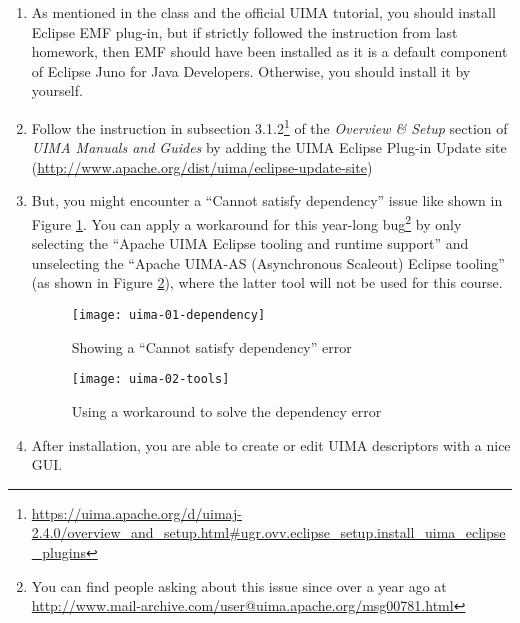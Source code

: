 \begin{enumerate}

\item As mentioned in the class and the official UIMA tutorial, you should
install Eclipse EMF plug-in, but if strictly followed the instruction from last
homework, then EMF should have been installed as it is a default component of
Eclipse Juno for Java Developers. Otherwise, you should install it by yourself.

\item Follow the instruction in subsection
3.1.2\footnote{\url{https://uima.apache.org/d/uimaj-2.4.0/overview_and_setup.html\#ugr.ovv.eclipse_setup.install_uima_eclipse_plugins}}
of the \emph{Overview \& Setup} section of \emph{UIMA Manuals and Guides} by
adding the UIMA Eclipse Plug-in Update site
(\url{http://www.apache.org/dist/uima/eclipse-update-site})

\item But, you might encounter a ``Cannot satisfy dependency'' issue like shown
in Figure \ref{fig:uima-01-dependency}. You can apply a workaround for this
year-long bug\footnote{You can find people asking about this issue since over a
year ago at
\url{http://www.mail-archive.com/user@uima.apache.org/msg00781.html}} by only
selecting the ``Apache UIMA Eclipse tooling and runtime support'' and
unselecting the ``Apache UIMA-AS (Asynchronous Scaleout) Eclipse tooling'' (as
shown in Figure \ref{fig:uima-02-tools}), where the latter tool will not be used
for this course.

\begin{figure}[t]
\centering
\texttt{[image: uima-01-dependency]}
\caption{Showing a ``Cannot satisfy dependency'' error\label{fig:uima-01-dependency}}
\end{figure}

\begin{figure}[t]
\centering
\texttt{[image: uima-02-tools]}
\caption{Using a workaround to solve the dependency error\label{fig:uima-02-tools}}
\end{figure}

\item After installation, you are able to create or edit UIMA descriptors with a
nice GUI.
 
\end{enumerate}
